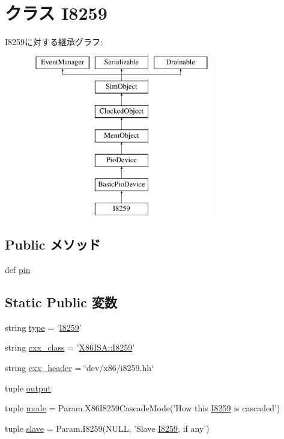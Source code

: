 \hypertarget{classI8259_1_1I8259}{
\section{クラス I8259}
\label{classI8259_1_1I8259}
}
I8259に対する継承グラフ:\begin{figure}[H]
\begin{center}
\leavevmode
\includegraphics[height=7cm]{classI8259_1_1I8259}
\end{center}
\end{figure}
\subsection*{Public メソッド}
\begin{DoxyCompactItemize}
\item 
def \hyperlink{classI8259_1_1I8259_a55935323323b227bf5734e0fea2cc88f}{pin}
\end{DoxyCompactItemize}
\subsection*{Static Public 変数}
\begin{DoxyCompactItemize}
\item 
string \hyperlink{classI8259_1_1I8259_acce15679d830831b0bbe8ebc2a60b2ca}{type} = '\hyperlink{classI8259_1_1I8259}{I8259}'
\item 
string \hyperlink{classI8259_1_1I8259_a58cd55cd4023648e138237cfc0822ae3}{cxx\_\-class} = '\hyperlink{classX86ISA_1_1I8259}{X86ISA::I8259}'
\item 
string \hyperlink{classI8259_1_1I8259_a17da7064bc5c518791f0c891eff05fda}{cxx\_\-header} = \char`\"{}dev/x86/i8259.hh\char`\"{}
\item 
tuple \hyperlink{classI8259_1_1I8259_acf316e258896197f4e917a6547e49532}{output}
\item 
tuple \hyperlink{classI8259_1_1I8259_a2d32e91794d9088c7fe3e55f1a699012}{mode} = Param.X86I8259CascadeMode('How this \hyperlink{classI8259_1_1I8259}{I8259} is cascaded')
\item 
tuple \hyperlink{classI8259_1_1I8259_a9b8cb1f697e86858437a78f041478c9b}{slave} = Param.I8259(NULL, 'Slave \hyperlink{classI8259_1_1I8259}{I8259}, if any')
\end{DoxyCompactItemize}


